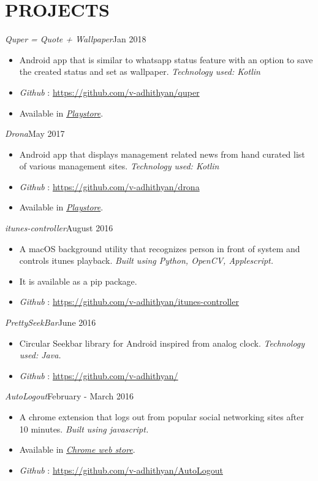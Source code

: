 \documentclass[11pt,a4paper]{article}
\begin{document}
\section*{PROJECTS}
\emph{Quper = Quote + Wallpaper}{\hfill Jan 2018}
\begin{itemize}[noitemsep]
\item Android app that is similar to whatsapp status feature with an option to save the created status and set as wallpaper. \emph{Technology used: Kotlin}
\item \emph{Github} : \href{https://github.com/v-adhithyan/quper}{https://github.com/v-adhithyan/quper}
\item Available in \href{https://play.google.com/store/apps/details?id=ceg.avtechlabs.quper}{\emph{Playstore}}.
\end{itemize}
\emph{Drona}{\hfill May 2017}
\begin{itemize}[noitemsep]
\item Android app that displays management related news from hand curated list of various management sites. \emph{Technology used: Kotlin}
\item \emph{Github} : \href{https://github.com/v-adhithyan/drona}{https://github.com/v-adhithyan/drona}
\item Available in \href{https://play.google.com/store/apps/details?id=ceg.avtechlabs.mba}{\emph{Playstore}}.
\end{itemize}
\emph{itunes-controller}{\hfill August 2016}
\begin{itemize}[noitemsep]
\item A macOS background utility that recognizes person in front of system and controls itunes playback. \emph{Built using
Python, OpenCV, Applescript.}
\item It is available as a pip package.
\item \emph{Github} : \href{https://github.com/v-adhithyan/itunes-controller}{https://github.com/v-adhithyan/itunes-controller}
\end{itemize}
\emph{PrettySeekBar}{\hfill June 2016}
\begin{itemize}[noitemsep]
\item Circular Seekbar library for Android inspired from analog clock. \emph{Technology used: Java.}
\item \emph{Github} : \href{https://github.com/v-adhithyan/PrettySeekBar}{https://github.com/v-adhithyan/}
\end{itemize}
\emph{AutoLogout}{\hfill February - March 2016}
\begin{itemize}[noitemsep]
\item A chrome extension that logs out from popular social networking sites after 10 minutes. \emph{Built using javascript.}
\item Available in \href{https://chrome.google.com/webstore/detail/auto-logout/affkccgnaoeohjnojjnpdalhpjhdiebh?hl=en}{\emph{Chrome web store}}.
\item \emph{Github} : \href{https://github.com/v-adhithyan/AutoLogout}{https://github.com/v-adhithyan/AutoLogout}
\end{itemize}
\end{document}
